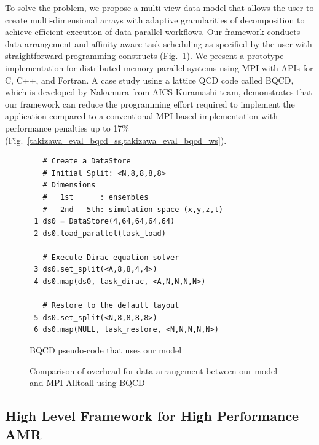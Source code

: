 \documentclass{book}
\begin{document}
To solve the problem, we propose a multi-view data model that allows the user to create multi-dimensional arrays with adaptive granularities of decomposition to achieve efficient execution of data parallel workflows.
Our framework conducts data arrangement and affinity-aware task scheduling as specified by the user with straightforward programming constructs (Fig.~\ref{takizawa_sample}).
We present a prototype implementation for distributed-memory parallel systems using MPI with APIs for C, C++, and Fortran.
A case study using a lattice QCD code called BQCD, which is developed by Nakamura from AICS Kuramashi team, demonstrates that our framework can reduce the programming effort required to implement the application compared to a conventional MPI-based implementation with performance penalties up to 17\% (Fig.~\ref{takizawa_eval_bqcd_ss,takizawa_eval_bqcd_ws}).

\begin{figure}[t]
\centering
\begin{verbatim}
   # Create a DataStore
   # Initial Split: <N,8,8,8,8>
   # Dimensions
   #   1st      : ensembles
   #   2nd - 5th: simulation space (x,y,z,t)
 1 ds0 = DataStore(4,64,64,64,64)
 2 ds0.load_parallel(task_load)

   # Execute Dirac equation solver
 3 ds0.set_split(<A,8,8,4,4>)
 4 ds0.map(ds0, task_dirac, <A,N,N,N,N>)

   # Restore to the default layout
 5 ds0.set_split(<N,8,8,8,8>)
 6 ds0.map(NULL, task_restore, <N,N,N,N,N>)
\end{verbatim}
\caption{BQCD pseudo-code that uses our model}
\label{takizawa_sample}
\end{figure}

\begin{figure}[t]
  \centering

  \hspace{0.1cm}

  \caption{Comparison of overhead for data arrangement between our model and MPI Alltoall using BQCD}
\end{figure}



\subsection{High Level Framework for High Performance AMR}
\end{document}
